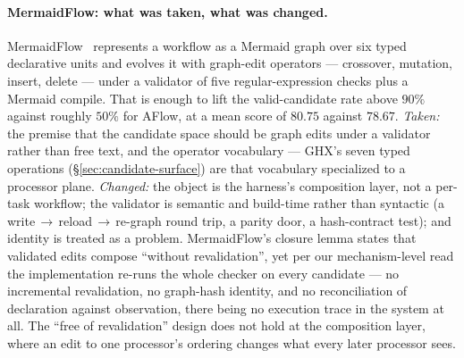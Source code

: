 \paragraph{MermaidFlow: what was taken, what was changed.}
MermaidFlow~\cite{mermaidflow} represents a workflow as a Mermaid graph
over six typed declarative units and evolves it with graph-edit operators
--- crossover, mutation, insert, delete --- under a validator of five
regular-expression checks plus a Mermaid compile. That is enough to lift
the valid-candidate rate above $90\%$ against roughly $50\%$ for AFlow, at
a mean score of $80.75$ against $78.67$. \emph{Taken:} the premise that
the candidate space should be graph edits under a validator rather than
free text, and the operator vocabulary --- GHX's seven typed operations
(\S\ref{sec:candidate-surface}) are that vocabulary specialized to a
processor plane. \emph{Changed:} the object is the harness's composition
layer, not a per-task workflow; the validator is semantic and build-time
rather than syntactic (a write\,$\to$\,reload\,$\to$\,re-graph round trip,
a parity door, a hash-contract test); and identity is treated as a
problem. MermaidFlow's closure lemma states that validated edits compose
``without revalidation'', yet per our mechanism-level read the
implementation re-runs the whole checker on every candidate --- no
incremental revalidation, no graph-hash identity, and no reconciliation of
declaration against observation, there being no execution trace in the
system at all. The ``free of revalidation'' design does not hold at the
composition layer, where an edit to one processor's ordering changes what
every later processor sees.


